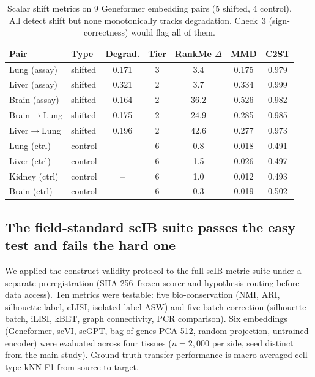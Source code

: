 \documentclass[9pt,lineno]{elife}
\begin{document}
\begin{table}[t]
\centering
\caption{Scalar shift metrics on 9 Geneformer embedding pairs (5 shifted, 4 control). All detect shift but none monotonically tracks degradation. Check~3 (sign-correctness) would flag all of them.}
\label{tab:scalar}
\small
\begin{tabular}{@{}llccccc@{}}
\toprule
Pair & Type & Degrad. & Tier & RankMe $\Delta$ & MMD & C2ST \\
\midrule
Lung (assay)  & shifted & 0.171 & 3 & 3.4  & 0.175 & 0.979 \\
Liver (assay) & shifted & 0.321 & 2 & 3.7  & 0.334 & 0.999 \\
Brain (assay) & shifted & 0.164 & 2 & 36.2 & 0.526 & 0.982 \\
Brain$\to$Lung  & shifted & 0.175 & 2 & 24.9 & 0.285 & 0.985 \\
Liver$\to$Lung  & shifted & 0.196 & 2 & 42.6 & 0.277 & 0.973 \\
\midrule
Lung (ctrl)   & control & -- & 6 & 0.8 & 0.018 & 0.491 \\
Liver (ctrl)  & control & -- & 6 & 1.5 & 0.026 & 0.497 \\
Kidney (ctrl) & control & -- & 6 & 1.0 & 0.012 & 0.493 \\
Brain (ctrl)  & control & -- & 6 & 0.3 & 0.019 & 0.502 \\
\bottomrule
\end{tabular}
\end{table}

\subsection{The field-standard scIB suite passes the easy test and fails the hard one}
\label{sec:scib}

We applied the construct-validity protocol to the full scIB metric suite \citep{luecken2022scib} under a separate preregistration (SHA-256--frozen scorer and hypothesis routing before data access). Ten metrics were testable: five bio-conservation (NMI, ARI, silhouette-label, cLISI, isolated-label ASW) and five batch-correction (silhouette-batch, iLISI, kBET, graph connectivity, PCR comparison). Six embeddings (Geneformer, scVI, scGPT, bag-of-genes PCA-512, random projection, untrained encoder) were evaluated across four tissues ($n = 2{,}000$ per side, seed distinct from the main study). Ground-truth transfer performance is macro-averaged cell-type kNN F1 from source to target.
\end{document}
